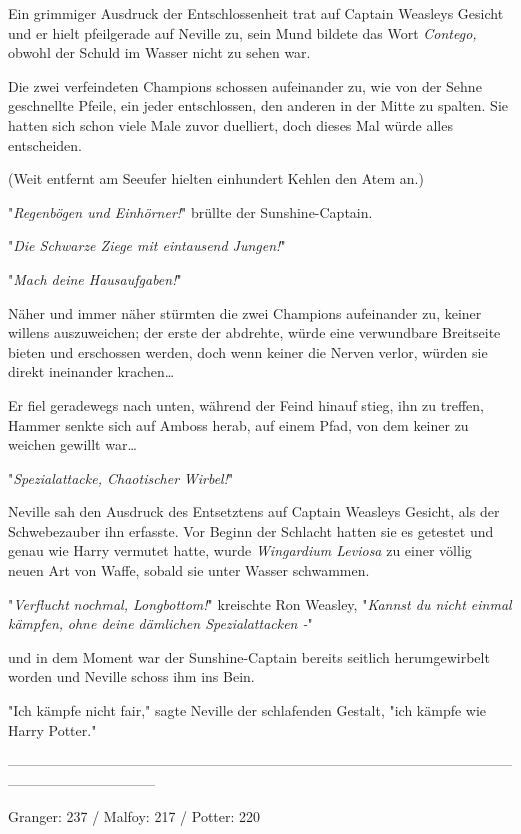 {Ein grimmiger Ausdruck der Entschlossenheit trat auf Captain Weasleys Gesicht und er hielt pfeilgerade auf Neville zu, sein Mund bildete das Wort \emph{Contego,} obwohl der Schuld im Wasser nicht zu sehen war.

Die zwei verfeindeten Champions schossen aufeinander zu, wie von der Sehne geschnellte Pfeile, ein jeder entschlossen, den anderen in der Mitte zu spalten. Sie hatten sich schon viele Male zuvor duelliert, doch dieses Mal würde alles entscheiden.

(Weit entfernt am Seeufer hielten einhundert Kehlen den Atem an.)

"\emph{Regenbögen und Einhörner!}" brüllte der Sunshine-Captain.

"\emph{Die Schwarze Ziege mit eintausend Jungen!}"

"\emph{Mach deine Hausaufgaben!}"

Näher und immer näher stürmten die zwei Champions aufeinander zu, keiner willens auszuweichen; der erste der abdrehte, würde eine verwundbare Breitseite bieten und erschossen werden, doch wenn keiner die Nerven verlor, würden sie direkt ineinander krachen…

Er fiel geradewegs nach unten, während der Feind hinauf stieg, ihn zu treffen, Hammer senkte sich auf Amboss herab, auf einem Pfad, von dem keiner zu weichen gewillt war…

"\emph{Spezialattacke, Chaotischer} \emph{Wirbel!}"

Neville sah den Ausdruck des Entsetztens auf Captain Weasleys Gesicht, als der Schwebezauber ihn erfasste. Vor Beginn der Schlacht hatten sie es getestet und genau wie Harry vermutet hatte, wurde \emph{Wingardium Leviosa} zu einer völlig neuen Art von Waffe, sobald sie unter Wasser schwammen.

"\emph{Verflucht} \emph{nochmal, Longbottom!}" kreischte Ron Weasley, "\emph{Kannst du nicht einmal} \emph{kämpfen,} \emph{ohne deine dämlichen Spezialattacken -}"

und in dem Moment war der Sunshine-Captain bereits seitlich herumgewirbelt worden und Neville schoss ihm ins Bein.

"Ich kämpfe nicht fair," sagte Neville der schlafenden Gestalt, "ich kämpfe wie Harry Potter."

--------------------------------------------------------------------------------------------------------------------------------------------

Granger: 237 / Malfoy: 217 / Potter: 220

}
